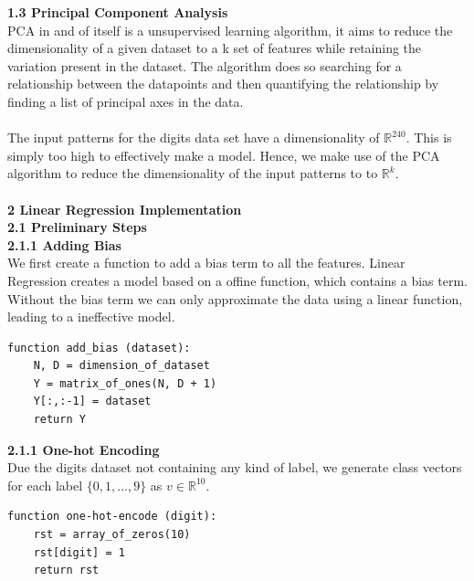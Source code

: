 \documentclass[a4paper]{article}
\begin{document}
\textbf{{\large 1.3 Principal Component Analysis}} \\

PCA in and of itself is a unsupervised learning algorithm, it aims to reduce the dimensionality of a given dataset to a k set of features while retaining the variation present in the dataset. The algorithm does so searching for a relationship between the datapoints and then quantifying the relationship by finding a list of principal axes in the data. \\ \\
The input patterns for the digits data set have a dimensionality of $\mathbb{R}^{240}$. This is simply too high to effectively make a model. Hence, we make use of the PCA algorithm to reduce the dimensionality of the input patterns to to $\mathbb{R}^{k}$. \\
\\

\textbf{{\Large 2 Linear Regression Implementation}} \\ 

\textbf{{\large 2.1 Preliminary Steps}} \\ 

\textbf{2.1.1 Adding Bias} \\

We first create a function to add a bias term to all the features. Linear Regression creates a model based on a offine function, which contains a bias term. Without the bias term we can only approximate the data using a linear function, leading to a ineffective model. \\

\begin{lstlisting}
function add_bias (dataset):
    N, D = dimension_of_dataset
    Y = matrix_of_ones(N, D + 1)
    Y[:,:-1] = dataset
    return Y
\end{lstlisting}


\textbf{2.1.1 One-hot Encoding} \\

Due the digits dataset not containing any kind of label, we generate class vectors for each label $\{0,1,...,9\}$ as $v \in \mathbb{R}^{10}$. \\

\begin{lstlisting}
function one-hot-encode (digit):
    rst = array_of_zeros(10)
    rst[digit] = 1
    return rst 
\end{lstlisting}
\qquad \\
\end{document}
